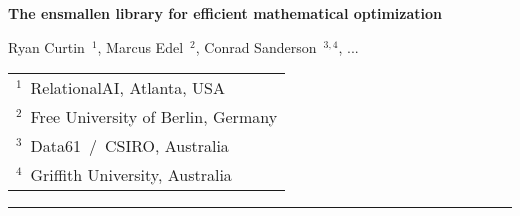 \documentclass[10pt]{article}
\begin{document}
\begin{center}

{\Large\bf The ensmallen library for efficient mathematical optimization}

\vspace{1.5ex}
{Ryan Curtin~{$^1$}, Marcus Edel~{$^2$}, Conrad Sanderson~{$^{3,4}$}, ...}
\vspace{1.5ex}

\begin{tabular}{l}
$^1$~RelationalAI, Atlanta, USA\\
$^2$~Free University of Berlin, Germany\\
$^3$~Data61~/~CSIRO, Australia\\
$^4$~Griffith University, Australia
\end{tabular}

\end{center}




\vspace{4ex}
\hrule

















\end{document}
